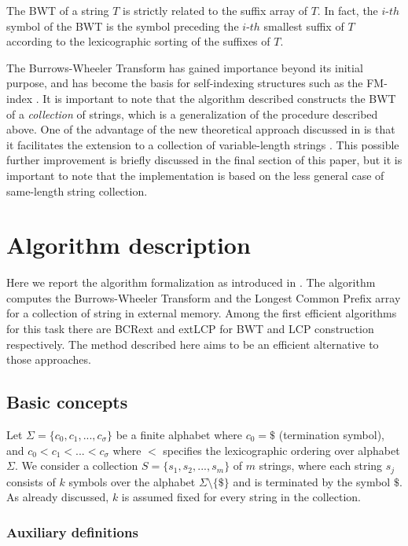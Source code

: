 \documentclass[a4paper,12pt, oneside]{article}
\begin{document}
The BWT of a string $T$ is strictly related to the suffix array of $T$. In fact, the $i$-$th$ symbol of the BWT is the symbol preceding the $i$-$th$ smallest suffix of $T$ according to the lexicographic sorting of the suffixes of $T$.\par 
The Burrows-Wheeler Transform has gained importance beyond its initial purpose, and has become the basis for self-indexing structures such as the FM-index \cite{ferraginafmindex}.
It is important to note that the algorithm described constructs the BWT of a \textit{collection} of strings, which is a generalization of the procedure described above. One of the advantage of the new theoretical approach discussed in \cite{paper} is that it facilitates the extension to a collection of variable-length strings . This possible further improvement is briefly discussed in the final section of this paper, but it is important to note that the implementation is based on the less general case of same-length string collection.



\newpage
\section{Algorithm description}
Here we report the algorithm formalization as introduced in \cite{paper}. The algorithm computes the Burrows-Wheeler Transform and the Longest Common Prefix array for a collection of string in external memory. Among the first efficient algorithms for this task there are BCRext\cite{bcrext} and extLCP\cite{extlcp} for BWT and LCP construction respectively. The method described here aims to be an efficient alternative to those approaches.

\subsection{Basic concepts}

Let $\Sigma = \{c_0, c_1,...,c_\sigma\}$ be a finite alphabet where $c_0 = \$$ (termination symbol), and $c_0 < c_1 < ... < c_\sigma$ where $<$ specifies the lexicographic ordering over alphabet $\Sigma$. We consider a collection $S = \{s_1, s_2,...,s_m\}$ of $m$ strings, where each string $s_j$ consists of $k$ symbols over the alphabet $\Sigma\setminus\{\$\}$ and is terminated by the symbol $\$$. As already discussed, $k$ is assumed fixed for every string in the collection.


\subsubsection{Auxiliary definitions}
\end{document}
